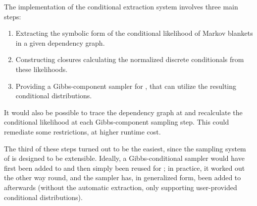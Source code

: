 The implementation of the conditional extraction system involves three main steps:
\begin{enumerate}
  \firmlist
\item Extracting the symbolic form of the conditional likelihood of Markov blankets in a given
  dependency graph.
\item Constructing closures calculating the normalized discrete conditionals from these likelihoods.
\item Providing a Gibbs-component sampler for \turingjl{}, that can utilize the resulting
  conditional distributions.
\end{enumerate}
It would also be possible to trace the dependency graph at and recalculate the conditional
likelihood at each Gibbs-component sampling step.  This could remediate some restrictions, at higher
runtime cost.

The third of these steps turned out to be the easiest, since the sampling system of \turingjl{} is
designed to be extensible.  Ideally, a Gibbs-conditional sampler would have first been added to
\turingjl{} and then simply been reused for \autogibbsjl{}; in practice, it worked out the other way
round, and the \autogibbsjl{} sampler has, in generalized form, been added to \turingjl{} afterwards
(without the automatic extraction, only supporting user-provided conditional distributions).


